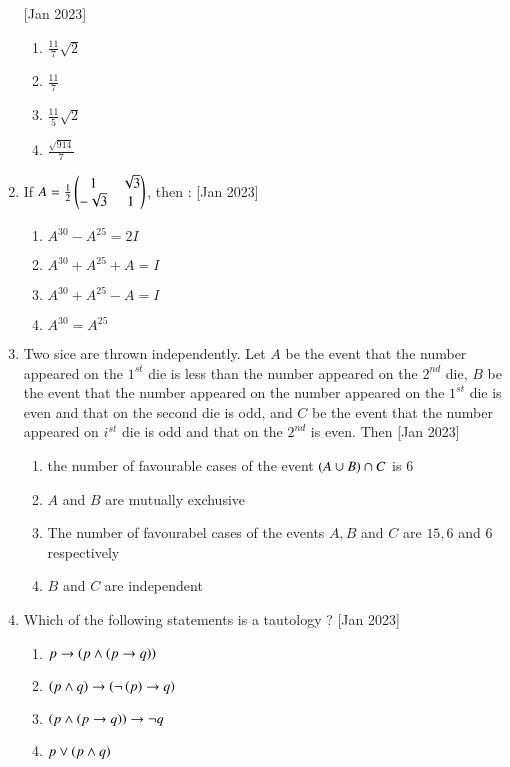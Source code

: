 \documentclass[journal]{IEEEtran}
\begin{document}
\begin{enumerate}
       	\hfill{[Jan 2023]}
		\begin{enumerate}
			\item $\frac{11}{7}\sqrt{2}$
			\item $\frac{11}{7}$
			\item $\frac{11}{5}\sqrt{2}$
			\item $\frac{\sqrt{914}}{7}$
		\end{enumerate}
	\item If $A=\frac{1}{2}\begin{pmatrix}1&\sqrt{3}\\-\sqrt{3}&1\end{pmatrix}$, then :
		\hfill{[Jan 2023]}
		\begin{enumerate}
			\item $A^{30}-A^{25}=2I$
			\item $A^{30}+A^{25}+A=I$
			\item $A^{30}+A^{25}-A=I$
	                \item $A^{30}=A^{25}$
        	\end{enumerate}
	\item Two sice are thrown independently. Let $A$ be the event that the number appeared on the $1^{st}$ die is less than the number appeared on the $2^{nd}$ die, $B$ be the event that the number appeared on the number appeared on the $1^{st}$ die is even and that on the second die is odd, and $C$ be the event that the number appeared on $i^{st}$ die is odd and that on the $2^{nd}$ is even. Then
		\hfill{[Jan 2023]}
		\begin{enumerate}
			\item the number of favourable cases of the event $\left(A \cup B\right)\cap C$ is $6$
			\item $A$ and $B$ are mutually exchusive 
			\item The number of favourabel cases of the events $A,B$ and $C$ are $15,6$ and $6$ respectively 
			\item $B$ and $C$ are independent
        	\end{enumerate}	
	\item Which of the following statements is a tautology ?
		\hfill{[Jan 2023]}
		\begin{enumerate}
			\item $p \rightarrow \left(p\wedge \left(p \rightarrow q\right)\right)$
			\item $\left(p\wedge q\right)\rightarrow \left(\neg\left(p\right)\rightarrow q\right)$
			\item $\left(p\wedge \left(p \rightarrow q\right)\right)\rightarrow \neg q$
			\item $p \lor \left(p \wedge q\right)$
        	\end{enumerate}

\end{enumerate}
\end{document}
